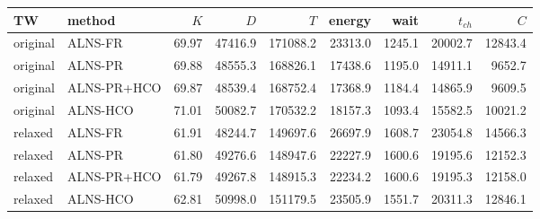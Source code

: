 \begin{tabular}{llrrrrrrr}
\toprule
TW & method & $K$ & $D$ & $T$ & energy & wait & $t_{ch}$ & $C$ \\
\midrule
original & ALNS-FR & 69.97 & 47416.9 & 171088.2 & 23313.0 & 1245.1 & 20002.7 & 12843.4 \\
original & ALNS-PR & 69.88 & 48555.3 & 168826.1 & 17438.6 & 1195.0 & 14911.1 & 9652.7 \\
original & ALNS-PR+HCO & 69.87 & 48539.4 & 168752.4 & 17368.9 & 1184.4 & 14865.9 & 9609.5 \\
original & ALNS-HCO & 71.01 & 50082.7 & 170532.2 & 18157.3 & 1093.4 & 15582.5 & 10021.2 \\
relaxed & ALNS-FR & 61.91 & 48244.7 & 149697.6 & 26697.9 & 1608.7 & 23054.8 & 14566.3 \\
relaxed & ALNS-PR & 61.80 & 49276.6 & 148947.6 & 22227.9 & 1600.6 & 19195.6 & 12152.3 \\
relaxed & ALNS-PR+HCO & 61.79 & 49267.8 & 148915.3 & 22234.2 & 1600.6 & 19195.3 & 12158.0 \\
relaxed & ALNS-HCO & 62.81 & 50998.0 & 151179.5 & 23505.9 & 1551.7 & 20311.3 & 12846.1 \\
\bottomrule
\end{tabular}
